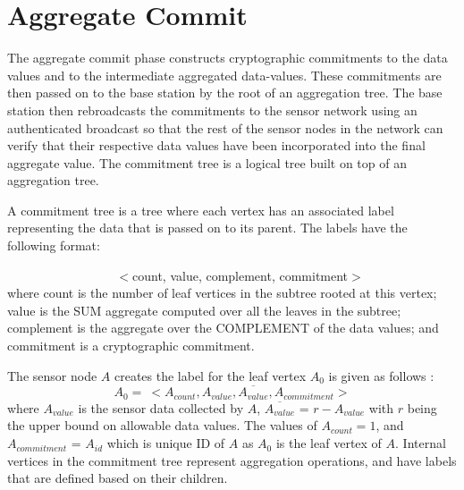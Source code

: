 \section{Aggregate Commit} 
	\label{sub:aggregate_commit}
	The aggregate commit phase constructs cryptographic commitments to the data values and to the intermediate aggregated data-values.
	These commitments are then passed on to the base station by the root of an aggregation tree.
	The base station then rebroadcasts the commitments to the sensor network using an authenticated broadcast so that the rest of the sensor nodes in the network can verify that their respective data values have been incorporated into the final aggregate value.
	The commitment tree is a logical tree built on top of an aggregation tree.
	\begin{definition}
		\cite{chan2006secure}
		A commitment tree is a tree where each vertex has an associated label representing the data that is passed on to its parent. The labels have the following format:

		$\hspace{100pt}$ $<$count, value, complement, commitment$>$\\
		where count is the number of leaf vertices in the subtree rooted at this vertex; value is the SUM aggregate computed over all the leaves in the subtree; complement is the aggregate over the COMPLEMENT of the data values; and commitment is a cryptographic commitment.
		\label{def:label}
	\end{definition}
	The sensor node $A$ creates the label for the leaf vertex $A_{0}$ is given as follows :
	\begin{equation*}
		A_{0} =\ <A_{count}, A_{value}, \overline{A_{value}}, A_{commitment}>
	\end{equation*}
	where $A_{value}$ is the sensor data collected by $A$, $\overline{A_{value}}$ = $r - A_{value}$ with $r$ being the upper bound on allowable data values.
	The values of $A_{count} = 1$, and $A_{commitment}$ = $A_{id}$ which is unique ID of $A$ as $A_{0}$ is the leaf vertex of $A$.
	Internal vertices in the commitment tree represent aggregation operations, and have labels that are defined based on their children. 

